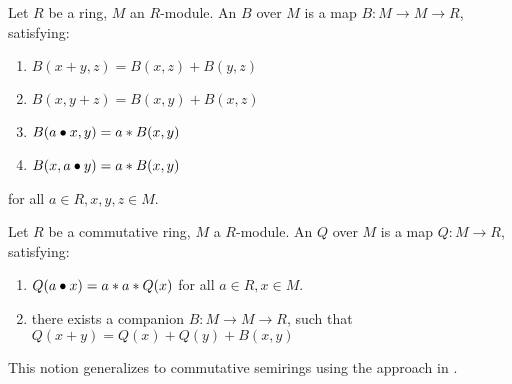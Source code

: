 \begin{definition}
    \label{BilinForm}
    \leanok

    Let $R$ be a ring, $M$ an $R$-module. An  $B$ over $M$ is a map $B : M \to M \to R$, satisfying:

    \begin{enumerate}

    \item $ B(x + y, z) = B(x, z) +B(y, z) $
    
    \item $ B(x, y + z) = B(x, y) +B(x, z) $
    
    \item $ B(a \bullet x, y) = a * B(x, y)$
    
    \item $ B(x, a \bullet y) = a * B(x, y)$
        
    \end{enumerate}

    for all $a \in R, x, y, z \in M$.

\end{definition}

\begin{definition}
    \label{QuadraticForm}
    \leanok

    Let $R$ be a commutative ring, $M$ a $R$-module. An  $Q$ over $M$ is a map $Q : M \to R$, satisfying:

    \begin{enumerate}

    \item $ Q(a \bullet x) = a * a * Q(x)$ for all $a \in R, x \in M$.
    
    \item there exists a companion  $B : M \to M \to R$, such that $Q(x + y) = Q(x) + Q(y) + B(x, y)$
    
    \end{enumerate}
\end{definition}

\begin{remark}
    \label{mk:QuadraticForm}

    This notion generalizes to commutative semirings using the approach in \cite{izhakian2016}.
    
\end{remark}